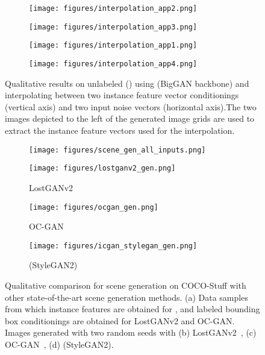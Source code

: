  \begin{figure}
\centering
\begin{subfigure}{0.48\textwidth}
 \centering
\texttt{[image: figures/interpolation\_app2.png]}
\end{subfigure}
\begin{subfigure}{0.48\textwidth}
 \centering
\texttt{[image: figures/interpolation\_app3.png]}
\end{subfigure}
\begin{subfigure}{0.48\textwidth}
 \centering
\texttt{[image: figures/interpolation\_app1.png]}
\end{subfigure}
\begin{subfigure}{0.48\textwidth}
 \centering
\texttt{[image: figures/interpolation\_app4.png]}
\end{subfigure}
\caption{Qualitative results on unlabeled \ImNet () using \ours (BigGAN backbone) and interpolating between two instance feature vector conditionings (vertical axis) and two input noise vectors (horizontal axis).The two images depicted to the left of the generated image grids are used to extract the instance feature vectors used for the interpolation.}
\label{fig:app_interpolation}
\end{figure}

 \begin{figure}[h]
\centering
\begin{subfigure}[t]{0.1465\textwidth}
 \centering
\texttt{[image: figures/scene\_gen\_all\_inputs.png]}
\caption{ }
\label{subfig:coco_app_input}
\end{subfigure}
\begin{subfigure}[t]{0.26\textwidth}
 \centering
\texttt{[image: figures/lostganv2\_gen.png]}
\caption{LostGANv2~\cite{sun2020learning}}
\label{subfig:coco_app_lg2}
\end{subfigure}
\begin{subfigure}[t]{0.26\textwidth}
 \centering
\texttt{[image: figures/ocgan\_gen.png]}
\caption{OC-GAN~\cite{sylvain2020object} }
\label{subfig:coco_app_ocgan}
\end{subfigure}
\begin{subfigure}[t]{0.26\textwidth}
 \centering
\texttt{[image: figures/icgan\_stylegan\_gen.png]}
\caption{\ours (StyleGAN2) }
\label{subfig:coco_app_input2}
\end{subfigure}

\caption{Qualitative comparison for scene generation on  COCO-Stuff with other state-of-the-art scene generation methods. (a) Data samples  from which instance features  are obtained for \ours, and labeled bounding box conditionings are obtained for LostGANv2 and OC-GAN. Images generated with two random seeds with (b) LostGANv2~\cite{sun2020learning}, (c) OC-GAN~\cite{sylvain2020object}, (d) \ours (StyleGAN2).
}
\label{fig:coco_qualitative_sota}
\end{figure}

